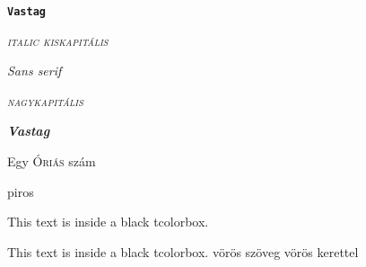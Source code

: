 \documentclass[]{article}
\begin{document}
\texttt{\textbf{Vastag}}

\textit{\textsc{italic kiskapitális}}

\textsl{\textsf{Sans serif}}

\emph{\textsc{nagykapitális}}

\emph{\textbf{Vastag}}

\Large Egy \textsc{Óriás} \huge szám

\begin{tcolorbox}
\color{red}
piros

\end{tcolorbox}
\begin{tcolorbox}
\end{tcolorbox}

\raisebox{\depth}{\scalebox{1}[-1]{Vízszintes}}

\raisebox{\depth}{\scalebox{2}[-1]{Vízszintes}}



\begin{tcolorbox}[colback=black, coltext=white]
This text is inside a black tcolorbox.
\end{tcolorbox}

\begin{tcolorbox}[
	colframe = red,
    standard jigsaw,
    opacityback=0,
]
This text is inside a black tcolorbox.
vörös szöveg vörös kerettel
\end{tcolorbox}
\end{document}
